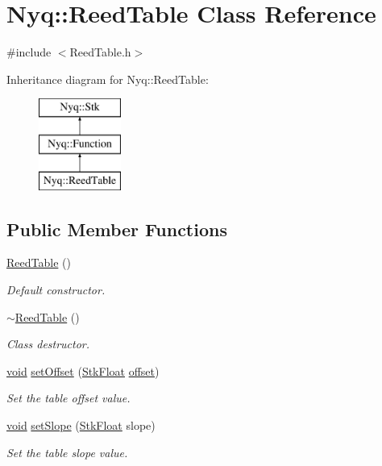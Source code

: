\hypertarget{class_nyq_1_1_reed_table}{}\section{Nyq\+:\+:Reed\+Table Class Reference}
\label{class_nyq_1_1_reed_table}


{\ttfamily \#include $<$Reed\+Table.\+h$>$}

Inheritance diagram for Nyq\+:\+:Reed\+Table\+:\begin{figure}[H]
\begin{center}
\leavevmode
\includegraphics[height=3.000000cm]{class_nyq_1_1_reed_table}
\end{center}
\end{figure}
\subsection*{Public Member Functions}
\begin{DoxyCompactItemize}
\item 
\hyperlink{class_nyq_1_1_reed_table_af223c80de6ce48baab8628a751b98486}{Reed\+Table} ()
\begin{DoxyCompactList}\small\item\em Default constructor. \end{DoxyCompactList}\item 
\hyperlink{class_nyq_1_1_reed_table_a6ad858d8af016afd5c8cba11ed059a56}{$\sim$\+Reed\+Table} ()
\begin{DoxyCompactList}\small\item\em Class destructor. \end{DoxyCompactList}\item 
\hyperlink{sound_8c_ae35f5844602719cf66324f4de2a658b3}{void} \hyperlink{class_nyq_1_1_reed_table_ac1d2a2581c5cbc0df610dd69502054b8}{set\+Offset} (\hyperlink{namespace_nyq_a044fa20a706520a617bbbf458a7db7e4}{Stk\+Float} \hyperlink{layer12_8c_a33d71f23ba2052d17f0b754dc35265b0}{offset})
\begin{DoxyCompactList}\small\item\em Set the table offset value. \end{DoxyCompactList}\item 
\hyperlink{sound_8c_ae35f5844602719cf66324f4de2a658b3}{void} \hyperlink{class_nyq_1_1_reed_table_ac7c331eb9e4d437f52f7c2996207440a}{set\+Slope} (\hyperlink{namespace_nyq_a044fa20a706520a617bbbf458a7db7e4}{Stk\+Float} slope)
\begin{DoxyCompactList}\small\item\em Set the table slope value. \end{DoxyCompactList}\end{DoxyCompactItemize}
